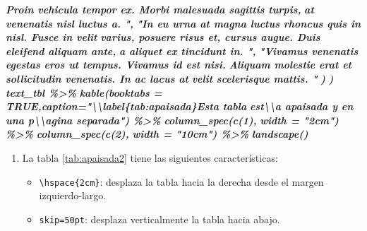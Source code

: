 \documentclass[12pt,a4paper,oneside,]{article}
\newenvironment{Shaded}{\begin{snugshade}}{\end{snugshade}}
\newcommand{\InformationTok}[1]{\textcolor[rgb]{0.56,0.35,0.01}{\textbf{\textit{#1}}}}
\providecommand{\tightlist}{%
  \setlength{\itemsep}{0pt}\setlength{\parskip}{0pt}}
\numberwithin{dummy}{section}
\theoremstyle{ocrenumbox}
\theoremstyle{blacknumex}
\theoremstyle{blacknumbox}
\theoremstyle{ocrenum}
\theoremstyle{ocrenum}
\begin{document}
\begin{Shaded}
\begin{Highlighting}[]
\InformationTok{    Proin vehicula tempor ex. Morbi malesuada sagittis turpis,}
\InformationTok{    at venenatis nisl luctus a. ",}
\InformationTok{    "In eu urna at magna luctus rhoncus quis in nisl. Fusce in velit}
\InformationTok{    varius, posuere risus et, cursus augue. Duis eleifend aliquam ante,}
\InformationTok{    a aliquet ex tincidunt in. ",}
\InformationTok{    "Vivamus venenatis egestas eros ut tempus. Vivamus id est nisi.}
\InformationTok{    Aliquam molestie erat et sollicitudin venenatis. In ac lacus at}
\InformationTok{    velit scelerisque mattis. "}
\InformationTok{    ) }
\InformationTok{  )}
\InformationTok{text\_tbl \%\textgreater{}\%}
\InformationTok{  kable(booktabs = TRUE,caption="\textbackslash{}\textbackslash{}label\{tab:apaisada\}Esta tabla }
\InformationTok{          est\textbackslash{}\textbackslash{}\textquotesingle{}a apaisada y en una p\textbackslash{}\textbackslash{}\textquotesingle{}agina separada") \%\textgreater{}\% }
\InformationTok{      column\_spec(c(1), }
\InformationTok{          width = "2cm") \%\textgreater{}\% }
\InformationTok{      column\_spec(c(2), }
\InformationTok{          width = "10cm") \%\textgreater{}\% }
\InformationTok{      landscape()}
\InformationTok{\textasciigrave{}\textasciigrave{}\textasciigrave{}}
\end{Highlighting}
\end{Shaded}

\begin{enumerate}
\def\labelenumi{\arabic{enumi}.}
\setcounter{enumi}{1}
\item
  La tabla \ref{tab:apaisada2} tiene las siguientes características:

  \begin{itemize}
  \tightlist
  \item
    \texttt{\textbackslash{}hspace\{2cm\}}: desplaza la tabla hacia la
    derecha desde el margen izquierdo-largo.
  \item
    \texttt{skip=50pt}: desplaza verticalmente la tabla hacia abajo.
  \end{itemize}
\end{enumerate}
\end{document}
